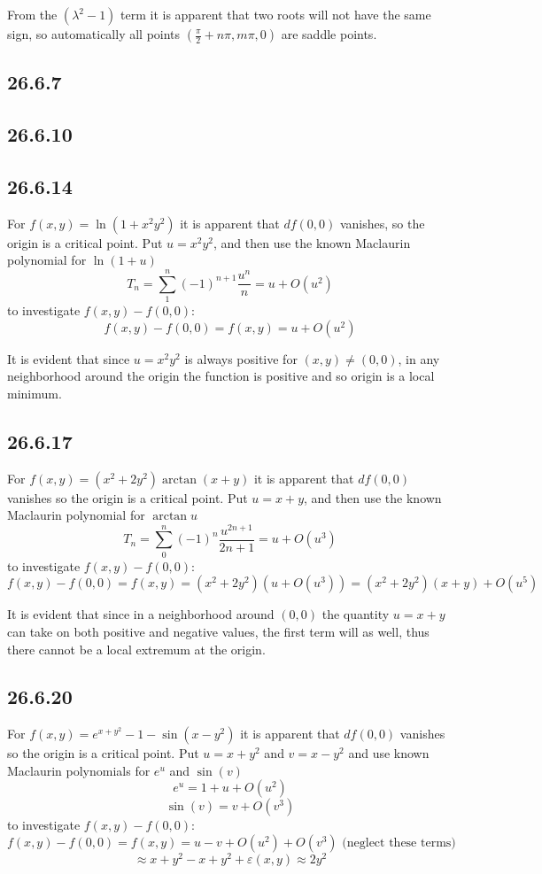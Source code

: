 \documentclass{article}
\begin{document}
From the $(\lambda^2 - 1)$ term it is apparent that two roots will not have the same sign, so automatically all points $(\frac{\pi}{2}+n\pi,m\pi ,0)$ are saddle points.

\subsection{26.6.7}

\subsection{26.6.10}

\subsection{26.6.14}

For $f(x,y) = \ln(1+x^2y^2)$ it is apparent that $df(0,0)$ vanishes, so the origin is a critical point. Put $u = x^2y^2$, and then use the known Maclaurin polynomial for $\ln(1+u)$
$$T_n = \sum_1^n (-1)^{n+1}\frac{u^n}{n} = u + O(u^2)$$ to investigate $f(x,y) - f(0,0)$: 
$$f(x,y) - f(0,0) = f(x,y)  = u + O(u^2)$$

It is evident that since $u = x^2y^2$ is always positive for $(x,y) \neq (0,0)$, in any neighborhood around the origin the function is positive and so origin is a local minimum.

\subsection{26.6.17}

For $f(x,y) = (x^2+2y^2)\arctan(x+y)$ it is apparent that $df(0,0)$ vanishes so the origin is a critical point. Put $u = x+y$, and then use the known Maclaurin polynomial for $\arctan{u}$
$$T_n = \sum_0^n (-1)^n\frac{u^{2n+1}}{2n+1} = u+O(u^3) $$ to investigate $f(x,y) - f(0,0)$: 
$$f(x,y) - f(0,0) = f(x,y) = (x^2+2y^2)(u+O(u^3)) = (x^2+2y^2)(x+y) + O(u^5)$$

It is evident that since in a neighborhood around $(0,0)$ the quantity $u = x+y$ can take on both positive and negative values, the first term will as well, thus there cannot be a local extremum at the origin.

\subsection{26.6.20}

For $f(x,y) = e^{x+y^2}-1-\sin(x-y^2)$ it is apparent that $df(0,0)$ vanishes so the origin is a critical point. Put $u = x+y^2$ and $v = x-y^2$ and use known Maclaurin polynomials for $e^u$ and $\sin(v)$ 
$$e^u = 1 + u + O(u^2)$$
$$\sin(v) = v + O(v^3)$$ to investigate $f(x,y) - f(0,0)$:
$$f(x,y) - f(0,0) = f(x,y) = u-v +O(u^2) +O(v^3) \text{ (neglect these terms)}$$
$$\approx x+y^2 - x+y^2 + \varepsilon(x,y) \approx 2y^2$$
\end{document}
